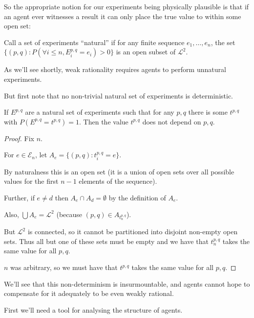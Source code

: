 So the appropriate notion for our experiments being physically plausible
is that if an agent ever witnesses a result it can only place the true
value to within some open set:

\begin{definition}
Call a set of experiments ``natural'' if for any finite sequence
$e_1, \ldots, e_n$,
the set $\{(p, q): P(\forall i \leq n, E^{p, q}_i = e_i) > 0\}$
is an open subset of $\mathcal{L}^2$.
\end{definition}

As we'll see shortly, weak rationality requires agents to perform
unnatural experiments.

But first note that no non-trivial natural set of experiments is
deterministic.

\begin{theorem}
If $E^{p, q}$
are a natural set of experiments such that for any $p, q$
there is some $t^{p, q}$
with $P(E^{p, q} = t^{p, q}) = 1$.
Then the value $t^{p, q}$
does not depend on $p, q$.
\end{theorem}

\begin{proof}

Fix $n$.

For $e \in \mathcal{E}_n$, let $A_e = \{(p, q): t^{p, q}_i = e\}$.

By naturalness this is an open set (it is a union of open sets over
all possible values for the first $n - 1$ elements of the sequence).

Further, if $e \neq d$ then $A_e \cap A_d = \emptyset$
by the definition of $A_e$.

Also, $\bigcup A_e = \mathcal{L}^2$
(because $(p, q) \in A_{t^{p, q}_n}$).

But $\mathcal{L}^2$
is connected, so it cannot be partitioned into disjoint non-empty
open sets. Thus all but one of these sets must be empty and we have
that $t^{p, q}_n$
takes the same value for all $p, q$.

$n$
was arbitrary, so we must have that $t^{p, q}$
takes the same value for all $p, q$.
\end{proof}

We'll see that this non-determinism is insurmountable, and agents cannot
hope to compensate for it adequately to be even weakly rational.

First we'll need a tool for analysing the structure of agents.

